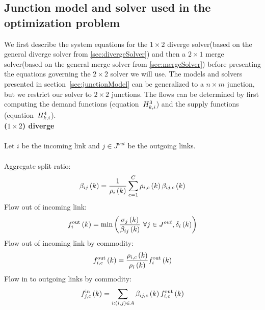 \subsection{Junction model and solver used in the optimization problem}
\label{sec:junctionModelForOpt}
We first describe the system equations for the $1 \times 2$ diverge solver(based on the general diverge solver from \ref{sec:divergeSolver}) and then a $2 \times 1$ merge solver(based on the general merge solver from \ref{sec:mergeSolver}) before presenting the equations governing the $2 \times 2$ solver we will use. The models and solvers presented in section~\ref{sec:junctionModel} can be generalized to a $n \times m$ junction, but we restrict our solver to $2 \times 2$ junctions. The flows can be determined by first computing the demand functions (equation~$\H{3}{\itime}{\icell}$) and the supply functions (equation~$\H{4}{\itime}{\icell}$). \\

\textbf{($1 \times 2$) diverge}\\
\\  \indent Let $i$ be the incoming link and $j \in J^{out}$ be the outgoing links.\\
\\	\indent \indent Aggregate split ratio:
	\[\aggsplitratio{i}{j}{k} = \frac{1}{\density{i}{k}} \sum_{c=1}^C \densitymc{i}{k}{c}\splitratio{i}{j}{k}{c}\]
	\indent \indent  Flow out of incoming link:
	\[\flowout{i}{k} = \min\left(\frac{\cellsupply{j}{k}}{\aggsplitratio{i}{j}{k}} \ \forall{j\in J^{out}}, \celldemand{i}{k}\right) \] 
	\indent \indent  Flow out of incoming link by commodity:
	\[\flowoutmc{i}{k}{c} = \frac{\densitymc{i}{k}{c}}{\density{i}{k}}\flowout{i}{k}\]
	\indent \indent  Flow in to outgoing links by commodity:
	\[\flowinmc{j}{k}{c} = \sum_{i:(i,j)\in A} \splitratio{i}{j}{k}{c} \flowoutmc{i}{k}{c}\]


